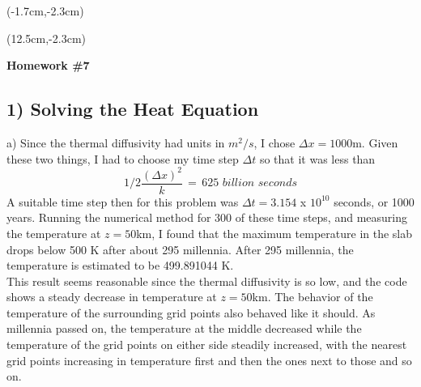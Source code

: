 \documentclass[12pt, oneside]{article}
\begin{document}
\begin{textblock*}{4cm}(-1.7cm,-2.3cm)
\end{textblock*}

\begin{textblock*}{8cm}(12.5cm,-2.3cm)
\end{textblock*}


\vspace{1cm}

\makeatletter
\setlength{\@fptop}{0pt}
\makeatother

\begin{center}
\textbf{\Large Homework \#7}
\end{center}


\subsection*{1) Solving the Heat Equation}
a) Since the thermal diffusivity had units in $m^2/s$, I chose $\Delta x = 1000$m. Given these two things, I had to choose my time step $\Delta t$ so that it was less than 
\[1/2 \dfrac{(\Delta x)^2}{k}\,=\, 625\,\,billion\,\,seconds \]
A suitable time step then for this problem was $\Delta t = 3.154$ x $10^{10}$ seconds, or 1000 years. Running the numerical method for 300 of these time steps, and measuring the temperature at $z=50$km, I found that the maximum temperature in the slab drops below 500 K after about 295 millennia. After 295 millennia, the temperature is estimated to be 499.891044 K.\\ 

This result seems reasonable since the thermal diffusivity is so low, and the code shows a steady decrease in temperature at $z=50$km. The behavior of the temperature of the surrounding grid points also behaved like it should. As millennia passed on, the temperature at the middle decreased while the temperature of the grid points on either side steadily increased, with the nearest grid points increasing in temperature first and then the ones next to those and so on. 
\end{document}
